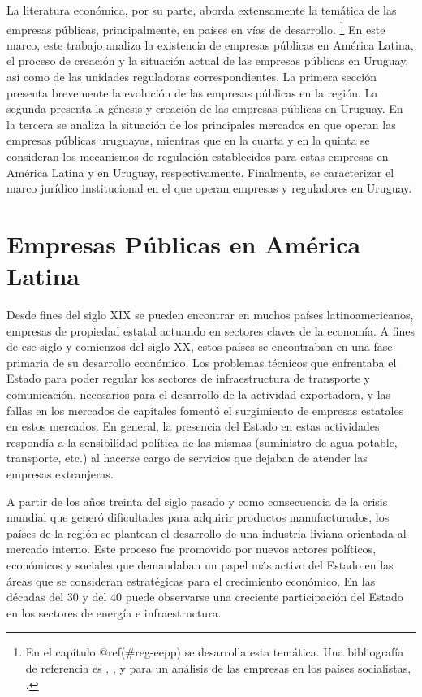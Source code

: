 \documentclass[
  12pt,
  spanish,
]{book}
\begin{document}
La literatura económica, por su parte, aborda extensamente la temática
de las empresas públicas, principalmente, en países en vías de
desarrollo. \footnote{En el capítulo @ref(\#reg-eepp) se desarrolla esta
  temática. Una bibliografía de referencia es \citet{Jones1982},
  \citet{WorldBank1995}, y para un análisis de las empresas en los
  países socialistas, \citet{Roland2000}.} En este marco, este trabajo
analiza la existencia de empresas públicas en América Latina, el proceso
de creación y la situación actual de las empresas públicas en Uruguay,
así como de las unidades reguladoras correspondientes. La primera
sección presenta brevemente la evolución de las empresas públicas en la
región. La segunda presenta la génesis y creación de las empresas
públicas en Uruguay. En la tercera se analiza la situación de los
principales mercados en que operan las empresas públicas uruguayas,
mientras que en la cuarta y en la quinta se consideran los mecanismos de
regulación establecidos para estas empresas en América Latina y en
Uruguay, respectivamente. Finalmente, se caracterizar el marco jurídico
institucional en el que operan empresas y reguladores en Uruguay.

\hypertarget{empresas-puxfablicas-en-amuxe9rica-latina}{%
\section{Empresas Públicas en América
Latina}\label{empresas-puxfablicas-en-amuxe9rica-latina}}

Desde fines del siglo XIX se pueden encontrar en muchos países
latinoamericanos, empresas de propiedad estatal actuando en sectores
claves de la economía. A fines de ese siglo y comienzos del siglo XX,
estos países se encontraban en una fase primaria de su desarrollo
económico. Los problemas técnicos que enfrentaba el Estado para poder
regular los sectores de infraestructura de transporte y comunicación,
necesarios para el desarrollo de la actividad exportadora, y las fallas
en los mercados de capitales fomentó el surgimiento de empresas
estatales en estos mercados. En general, la presencia del Estado en
estas actividades respondía a la sensibilidad política de las mismas
(suministro de agua potable, transporte, etc.) al hacerse cargo de
servicios que dejaban de atender las empresas extranjeras.

A partir de los años treinta del siglo pasado y como consecuencia de la
crisis mundial que generó dificultades para adquirir productos
manufacturados, los países de la región se plantean el desarrollo de una
industria liviana orientada al mercado interno. Este proceso fue
promovido por nuevos actores políticos, económicos y sociales que
demandaban un papel más activo del Estado en las áreas que se consideran
estratégicas para el crecimiento económico. En las décadas del 30 y del
40 puede observarse una creciente participación del Estado en los
sectores de energía e infraestructura.
\end{document}

